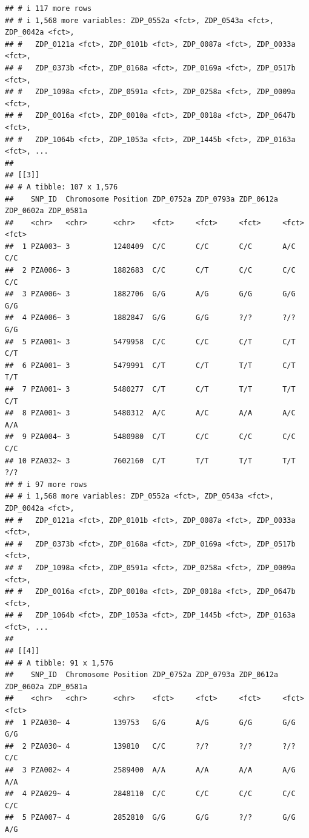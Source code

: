 \documentclass[
]{article}
\begin{document}
\begin{verbatim}
## # i 117 more rows
## # i 1,568 more variables: ZDP_0552a <fct>, ZDP_0543a <fct>, ZDP_0042a <fct>,
## #   ZDP_0121a <fct>, ZDP_0101b <fct>, ZDP_0087a <fct>, ZDP_0033a <fct>,
## #   ZDP_0373b <fct>, ZDP_0168a <fct>, ZDP_0169a <fct>, ZDP_0517b <fct>,
## #   ZDP_1098a <fct>, ZDP_0591a <fct>, ZDP_0258a <fct>, ZDP_0009a <fct>,
## #   ZDP_0016a <fct>, ZDP_0010a <fct>, ZDP_0018a <fct>, ZDP_0647b <fct>,
## #   ZDP_1064b <fct>, ZDP_1053a <fct>, ZDP_1445b <fct>, ZDP_0163a <fct>, ...
## 
## [[3]]
## # A tibble: 107 x 1,576
##    SNP_ID  Chromosome Position ZDP_0752a ZDP_0793a ZDP_0612a ZDP_0602a ZDP_0581a
##    <chr>   <chr>      <chr>    <fct>     <fct>     <fct>     <fct>     <fct>    
##  1 PZA003~ 3          1240409  C/C       C/C       C/C       A/C       C/C      
##  2 PZA006~ 3          1882683  C/C       C/T       C/C       C/C       C/C      
##  3 PZA006~ 3          1882706  G/G       A/G       G/G       G/G       G/G      
##  4 PZA006~ 3          1882847  G/G       G/G       ?/?       ?/?       G/G      
##  5 PZA001~ 3          5479958  C/C       C/C       C/T       C/T       C/T      
##  6 PZA001~ 3          5479991  C/T       C/T       T/T       C/T       T/T      
##  7 PZA001~ 3          5480277  C/T       C/T       T/T       T/T       C/T      
##  8 PZA001~ 3          5480312  A/C       A/C       A/A       A/C       A/A      
##  9 PZA004~ 3          5480980  C/T       C/C       C/C       C/C       C/C      
## 10 PZA032~ 3          7602160  C/T       T/T       T/T       T/T       ?/?      
## # i 97 more rows
## # i 1,568 more variables: ZDP_0552a <fct>, ZDP_0543a <fct>, ZDP_0042a <fct>,
## #   ZDP_0121a <fct>, ZDP_0101b <fct>, ZDP_0087a <fct>, ZDP_0033a <fct>,
## #   ZDP_0373b <fct>, ZDP_0168a <fct>, ZDP_0169a <fct>, ZDP_0517b <fct>,
## #   ZDP_1098a <fct>, ZDP_0591a <fct>, ZDP_0258a <fct>, ZDP_0009a <fct>,
## #   ZDP_0016a <fct>, ZDP_0010a <fct>, ZDP_0018a <fct>, ZDP_0647b <fct>,
## #   ZDP_1064b <fct>, ZDP_1053a <fct>, ZDP_1445b <fct>, ZDP_0163a <fct>, ...
## 
## [[4]]
## # A tibble: 91 x 1,576
##    SNP_ID  Chromosome Position ZDP_0752a ZDP_0793a ZDP_0612a ZDP_0602a ZDP_0581a
##    <chr>   <chr>      <chr>    <fct>     <fct>     <fct>     <fct>     <fct>    
##  1 PZA030~ 4          139753   G/G       A/G       G/G       G/G       G/G      
##  2 PZA030~ 4          139810   C/C       ?/?       ?/?       ?/?       C/C      
##  3 PZA002~ 4          2589400  A/A       A/A       A/A       A/G       A/A      
##  4 PZA029~ 4          2848110  C/C       C/C       C/C       C/C       C/C      
##  5 PZA007~ 4          2852810  G/G       G/G       ?/?       G/G       A/G      

\end{verbatim}
\end{document}

